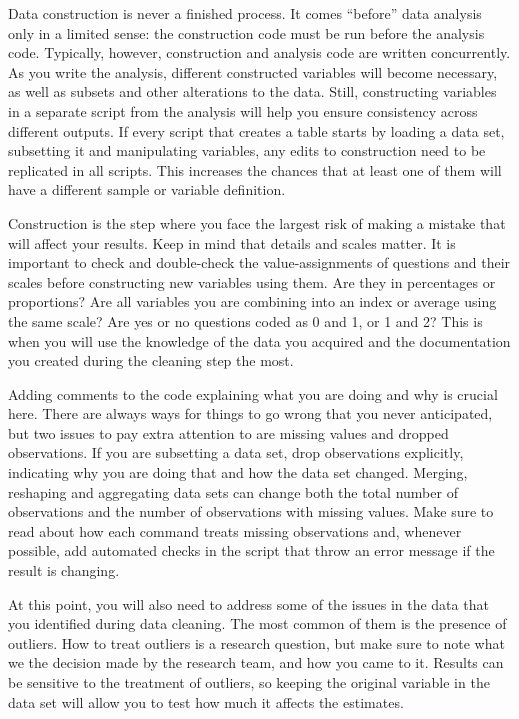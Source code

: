 Data construction is never a finished process.
It comes ``before'' data analysis only in a limited sense: the construction code must be run before the analysis code.
Typically, however, construction and analysis code are written concurrently.
As you write the analysis, different constructed variables will become necessary, as well as subsets and other alterations to the data.
Still, constructing variables in a separate script from the analysis will help you ensure consistency across different outputs. 
If every script that creates a table starts by loading a data set, subsetting it and manipulating variables, any edits to construction need to be replicated in all scripts. 
This increases the chances that at least one of them will have a different sample or variable definition.


Construction is the step where you face the largest risk of making a mistake that will affect your results. 
Keep in mind that details and scales matter. 
It is important to check and double-check the value-assignments of questions and their scales before constructing new variables using them. 
Are they in percentages or proportions? 
Are all variables you are combining into an index or average using the same scale? 
Are yes or no questions coded as 0 and 1, or 1 and 2?
This is when you will use the knowledge of the data you acquired and the documentation you created during the cleaning step the most.

Adding comments to the code explaining what you are doing and why is crucial here.
There are always ways for things to go wrong that you never anticipated, but two issues to pay extra attention to are missing values and dropped observations. 
If you are subsetting a data set, drop observations explicitly, indicating why you are doing that and how the data set changed.
Merging, reshaping and aggregating data sets can change both the total number of observations and the number of observations with missing values.
Make sure to read about how each command treats missing observations and, whenever possible, add automated checks in the script that throw an error message if the result is changing.

At this point, you will also need to address some of the issues in the data that you identified during data cleaning. 
The most common of them is the presence of outliers.
How to treat outliers is a research question, but make sure to note what we the decision made by the research team, and how you came to it. 
Results can be sensitive to the treatment of outliers, so keeping the original variable in the data set will allow you to test how much it affects the estimates.

